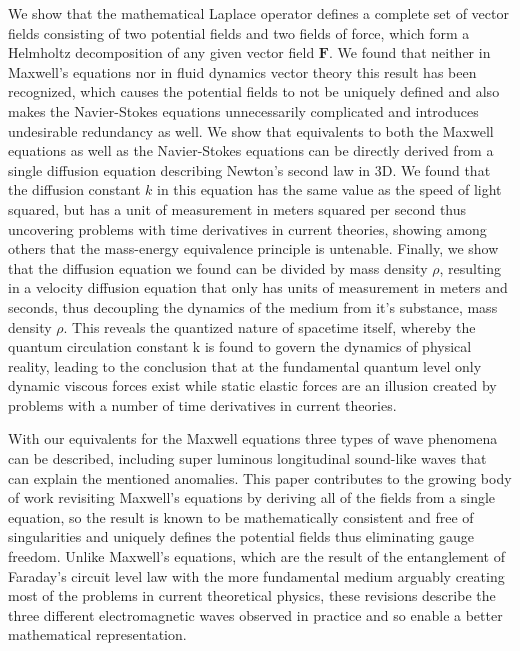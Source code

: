 \documentclass[twoside,final]{article}
\begin{document}
\begin{center}
{{We show that the mathematical Laplace operator defines a complete set of vector
fields consisting of two potential fields and two fields of force, which form a
Helmholtz decomposition of any given vector field $\mathbf{F}$. We found that
neither in Maxwell's equations nor in fluid dynamics vector theory this result
has been recognized, which causes the potential fields to not be uniquely
defined and also makes the Navier-Stokes equations unnecessarily complicated and
introduces undesirable redundancy as well. We show that equivalents to both the
Maxwell equations as well as the Navier-Stokes equations can be directly derived
from a single diffusion equation describing Newton's second law in 3D. We found
that the diffusion constant $k$ in this equation has the same value as the speed
of light squared, but has a unit of measurement in meters squared per second
thus uncovering problems with time derivatives in current theories, showing
among others that the mass-energy equivalence principle is untenable. Finally,
we show that the diffusion equation we found can be divided by mass density
$\rho$, resulting in a velocity diffusion equation that only has units of
measurement in meters and seconds, thus decoupling the dynamics of the medium
from it's substance, mass density $\rho$. This reveals the quantized nature of
spacetime itself, whereby the quantum circulation constant k is found to govern
the dynamics of physical reality, leading to the conclusion that at the
fundamental quantum level only dynamic viscous forces exist while static elastic
forces are an illusion created by problems with a number of time derivatives in
current theories.

With our equivalents for the Maxwell equations three types of wave phenomena can
be described, including super luminous longitudinal sound-like waves that can
explain the mentioned anomalies. This paper contributes to the growing body of
work revisiting Maxwell's equations \cite{vanVlaenderen2001, Barrett1993,
Pinheiro2005, Behera2018, Nedic2017, Atsukovsky2011, Arbab2014, Onoochin2019,
Gray2019, Shaw2014} by deriving all of the fields from a single equation, so the
result is known to be mathematically consistent and free of singularities and
uniquely defines the potential fields thus eliminating gauge freedom. Unlike
Maxwell's equations, which are the result of the entanglement of Faraday's
circuit level law with the more fundamental medium arguably creating most of the
problems in current theoretical physics, these revisions describe the three
different electromagnetic waves observed in practice and so enable a better
mathematical representation.


}}
\end{center}
\end{document}
